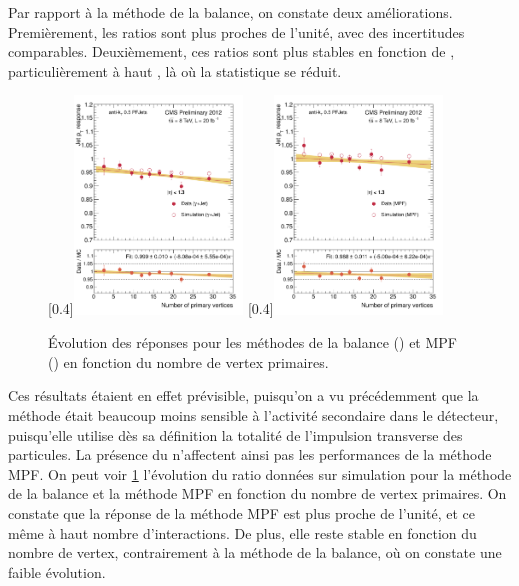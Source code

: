 Par rapport à la méthode de la balance, on constate deux améliorations. Premièrement, les ratios sont plus proches de l'unité, avec des incertitudes comparables. Deuxièmement, ces ratios sont plus stables en fonction de \aeta, particulièrement à haut \aeta, là où la statistique se réduit.

\begin{figure}[p!]
    \centering
    \subcaptionbox{\label{fig:npv_bal_eta013}}[0.4\textwidth]{\includegraphics[width=0.4\textwidth]{chapitre4/figs/resp_vs_npv/resp_balancing_eta013_vs_npv_FITLINE.pdf}}\qquad
    \subcaptionbox{\label{fig:npv_mpf_eta013}}[0.4\textwidth]{\includegraphics[width=0.4\textwidth]{chapitre4/figs/resp_vs_npv/resp_mpf_eta013_vs_npv_FITLINE.pdf}}
    \caption{Évolution des réponses pour les méthodes de la balance () et MPF () en fonction du nombre de vertex primaires.}
    \label{fig:resp_vs_npv}
\end{figure}

Ces résultats étaient en effet prévisible, puisqu'on a vu précédemment que la méthode était beaucoup moins sensible à l'activité secondaire dans le détecteur, puisqu'elle utilise dès sa définition la totalité de l'impulsion transverse des particules. La présence du \pu n'affectent ainsi pas les performances de la méthode MPF. On peut voir \cref{fig:resp_vs_npv} l'évolution du ratio données sur simulation pour la méthode de la balance et la méthode MPF en fonction du nombre de vertex primaires. On constate que la réponse de la méthode MPF est plus proche de l'unité, et ce même à haut nombre d'interactions. De plus, elle reste stable en fonction du nombre de vertex, contrairement à la méthode de la balance, où on constate une faible évolution.


